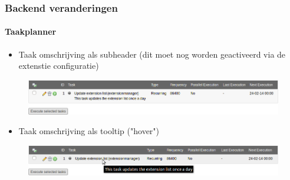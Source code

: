 
\begin{frame}[fragile]
	\frametitle{Backend veranderingen}
	\framesubtitle{Taakplanner}

	\begin{itemize}
		\item Taak omschrijving als  subheader\newline
			\small(dit moet nog worden geactiveerd via de extenstie configuratie)\normalsize
	\end{itemize}

	\begin{figure}
		\includegraphics[width=0.95\linewidth]{Images/BackendChanges/SchedulerTaskDescriptionAsSubheader.png}
	\end{figure}

	\begin{itemize}
		\item Taak omschrijving als tooltip ("hover")
	\end{itemize}

	\begin{figure}
		\includegraphics[width=0.95\linewidth]{Images/BackendChanges/SchedulerTaskDescriptionAsTooltip.png}
	\end{figure}

\end{frame}


